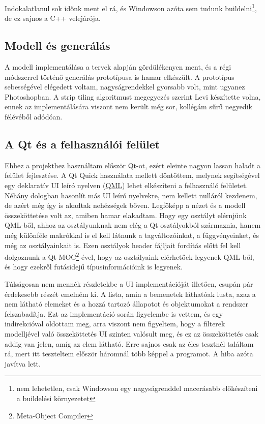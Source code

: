 Indokalatlanul sok időnk ment el rá, és Windowson azóta sem tudunk buildelni\footnote{nem lehetetlen, csak Windowson egy nagyságrenddel macerásabb előkészíteni a buildelési környezetet}, de ez sajnos a C++ velejárója.

\subsection{Modell és generálás}

A modell implementálása a tervek alapján gördülékenyen ment, és a régi módszerrel történő generálás prototípusa is hamar elkészült. A prototípus sebességével elégedett voltam, nagyságrendekkel gyorsabb volt, mint ugyanez Photoshopban. A strip tiling algoritmust megegyezés szerint Levi készítette volna, ennek az implementálására viszont nem került még sor, kollégám sűrű negyedik félévéből adódóan.

\subsection{A Qt és a felhasználói felület}

Ehhez a projekthez használtam először Qt-ot, ezért eleinte nagyon lassan haladt a felület fejlesztése. A Qt Quick használata mellett döntöttem, melynek segítségével egy deklaratív UI leíró nyelven (\href{https://en.wikipedia.org/wiki/QML}{QML}) lehet elkészíteni a felhasználó felületet. Néhány dologban hasonlít más UI leíró nyelvekre, nem kellett nulláról kezdenem, de azért még így is akadtak nehézségek bőven. Legfőképp a nézet és a modell összeköttetése volt az, amiben hamar elakadtam. Hogy egy osztályt elérnjünk QML-ből, ahhoz az osztályunknak nem elég a Qt osztályokból származnia, hanem még különféle makrókkal is el kell látnunk a tagváltozóinkat, a függvényeinket, és még az osztályainkait is. Ezen osztályok header fájljait fordítás előtt fel kell dolgoznunk a Qt MOC\footnote{Meta-Object Compiler}-ével, hogy az osztályaink elérhetőek legyenek QML-ből, és hogy ezekről futásidejű típusinformációink is legyenek. 

Túlságosan nem mennék részletekbe a UI implementációját illetően, csupán pár érdekesebb részét emelném ki. A lista, amin a bemenetek láthatóak lusta, azaz a nem látható elemeket és a hozzá tartozó állapotot és objektumokat a rendszer felszabadítja. Ezt az implementáció során figyelembe is vettem, és egy indirekcióval oldottam meg, arra viszont nem figyeltem, hogy a filterek modelljével való összeköttetés UI szinten valósult meg, és ez az összeköttetés csak addig van jelen, amíg az elem látható. Erre sajnos csak az éles tesztnél találtam rá, mert itt teszteltem először háromnál több képpel a programot. A hiba azóta javítva lett.

